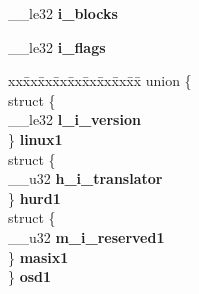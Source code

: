 \begin{DoxyCompactItemize}
\mbox{\label{structext3__inode_ac6dc473483679a5102612cffc52c2cf8}} 
\+\_\+\+\_\+le32 {\bfseries i\+\_\+blocks}
\item 
\mbox{\label{structext3__inode_a60620f67adf58bf5af93b30cca5e2a6b}} 
\+\_\+\+\_\+le32 {\bfseries i\+\_\+flags}
\item 
\mbox{\label{structext3__inode_ae42c777ddd9f11f75f71c4591b078523}} 
\begin{tabbing}
xx\=xx\=xx\=xx\=xx\=xx\=xx\=xx\=xx\=\kill
union \{\\
\>struct \{\\
\>\>\_\_le32 {\bfseries l\_i\_version}\\
\>\} {\bfseries linux1}\\
\>struct \{\\
\>\>\_\_u32 {\bfseries h\_i\_translator}\\
\>\} {\bfseries hurd1}\\
\>struct \{\\
\>\>\_\_u32 {\bfseries m\_i\_reserved1}\\
\>\} {\bfseries masix1}\\
\} {\bfseries osd1}\\


\end{tabbing}
\end{DoxyCompactItemize}
